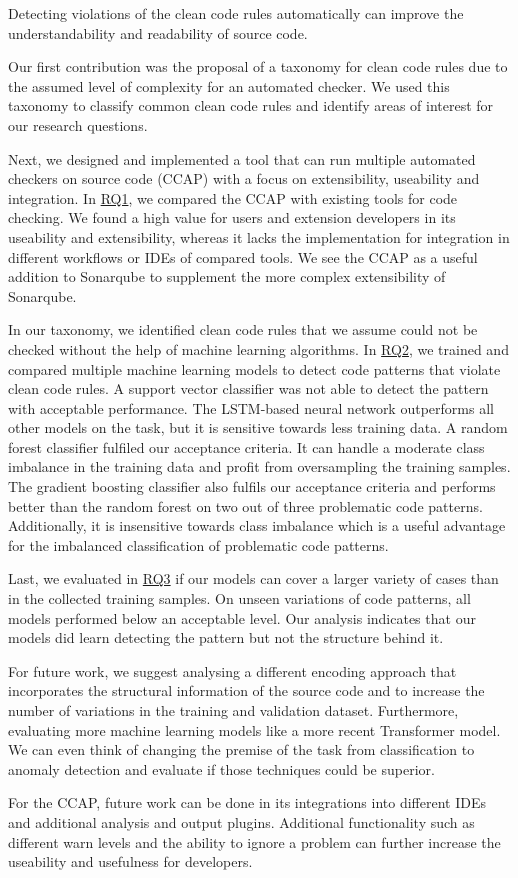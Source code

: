 

Detecting violations of the clean code rules automatically can improve the understandability and readability of source code. 

Our first contribution was the proposal of a taxonomy for clean code rules due to the assumed level of complexity for an automated checker.
We used this taxonomy to classify common clean code rules and identify areas of interest for our research questions.

Next, we designed and implemented a tool that can run multiple automated checkers on source code (CCAP) with a focus on extensibility, useability and integration. In \hyperref[rq:1]{RQ1}, we compared the CCAP with existing tools for code checking. We found a high value for users and extension developers in its useability and extensibility, whereas it lacks the implementation for integration in different workflows or IDEs of compared tools. We see the CCAP as a useful addition to Sonarqube to supplement the more complex extensibility of Sonarqube.

In our taxonomy, we identified clean code rules that we assume could not be checked without the help of machine learning algorithms. In \hyperref[rq:2]{RQ2}, we trained and compared multiple machine learning models to detect code patterns that violate clean code rules. A support vector classifier was not able to detect the pattern with acceptable performance. The LSTM-based neural network outperforms all other models on the task, but it is sensitive towards less training data.
A random forest classifier fulfiled our acceptance criteria. It can handle a moderate class imbalance in the training data and profit from oversampling the training samples. The gradient boosting classifier also fulfils our acceptance criteria and performs better than the random forest on two out of three problematic code patterns. Additionally, it is insensitive towards class imbalance which is a useful advantage for the imbalanced classification of problematic code patterns.

Last, we evaluated in \hyperref[rq:3]{RQ3} if our models can cover a larger variety of cases than in the collected training samples. On unseen variations of code patterns, all models performed below an acceptable level. Our analysis indicates that our models did learn detecting the pattern but not the structure behind it.

\medskip
For future work, we suggest analysing a different encoding approach that incorporates the structural information of the source code and to increase the number of variations in the training and validation dataset. Furthermore, evaluating more machine learning models like a more recent Transformer model. We can even think of changing the premise of the task from classification to anomaly detection and evaluate if those techniques could be superior.

For the CCAP, future work can be done in its integrations into different IDEs and additional analysis and output plugins. Additional functionality such as different warn levels and the ability to ignore a problem can further increase the useability and usefulness for developers.





